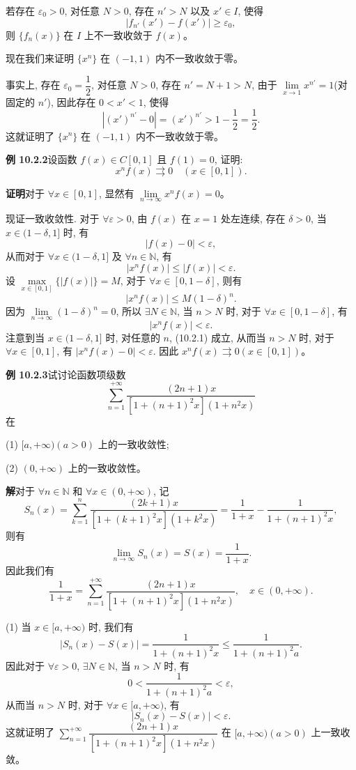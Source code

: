 \documentclass[UTF8, 12pt, fontset=fandol, oneside]{ctexart}
\begin{document}
若存在 $\varepsilon_0>0$, 对任意 $N>0$, 存在 $n'>N$ 以及 $x'\in I$, 使得
\[
  |f_{n'}(x')-f(x')|\geq\varepsilon_0,
\]
则 $\{f_n(x)\}$ 在 $I$ 上不一致收敛于 $f(x)$。

现在我们来证明 $\{x^n\}$ 在 $(-1,1)$ 内不一致收敛于零。

事实上, 存在 $\varepsilon_0=\dfrac12$, 对任意 $N>0$, 存在 $n'=N+1>N$, 由于 $\lim\limits_{x\to1}x^{n'}=1$(对固定的 $n'$), 因此存在 $0<x'<1$, 使得
\[
  |(x')^{n'}-0|=(x')^{n'}>1-\frac12=\frac12.
\]
这就证明了 $\{x^n\}$ 在 $(-1,1)$ 内不一致收敛于零。

\noindent\textbf{例 10.2.2}\quad 设函数 $f(x)\in C[0,1]$ 且 $f(1)=0$, 证明:
\[
  x^nf(x)\rightrightarrows0\quad(x\in[0,1]).
\]

\noindent\textbf{证明}\quad 对于 $\forall x\in[0,1]$, 显然有 $\lim\limits_{n\to\infty}x^nf(x)=0$。

现证一致收敛性. 对于 $\forall\varepsilon>0$, 由 $f(x)$ 在 $x=1$ 处左连续, 存在 $\delta>0$, 当 $x\in(1-\delta,1]$ 时, 有
\[
  |f(x)-0|<\varepsilon,
\]
从而对于 $\forall x\in(1-\delta,1]$ 及 $\forall n\in\mathbb N$, 有
\begin{equation}
  |x^nf(x)|\leq |f(x)|<\varepsilon.
  \tag{10.2.1}
\end{equation}
设 $\max\limits_{x\in[0,1]}\{|f(x)|\}=M$, 对于 $\forall x\in[0,1-\delta]$, 则有
\[
  |x^nf(x)|\leq M(1-\delta)^n.
\]
因为 $\lim\limits_{n\to\infty}(1-\delta)^n=0$, 所以 $\exists N\in\mathbb N$, 当 $n>N$ 时, 对于 $\forall x\in[0,1-\delta]$, 有
\[
  |x^nf(x)|<\varepsilon.
\]
注意到当 $x\in(1-\delta,1]$ 时, 对任意的 $n$, (10.2.1) 成立, 从而当 $n>N$ 时, 对于 $\forall x\in[0,1]$, 有 $|x^nf(x)-0|<\varepsilon$. 因此 $x^nf(x)\rightrightarrows0(x\in[0,1])$。

\noindent\textbf{例 10.2.3}\quad 试讨论函数项级数
\[
  \sum_{n=1}^{+\infty}\frac{(2n+1)x}{[1+(n+1)^2x](1+n^2x)}
\]
在

(1) $[a,+\infty)(a>0)$ 上的一致收敛性;

(2) $(0,+\infty)$ 上的一致收敛性。

\noindent\textbf{解}\quad 对于 $\forall n\in\mathbb N$ 和 $\forall x\in(0,+\infty)$, 记
\[
  S_n(x)=\sum_{k=1}^n\frac{(2k+1)x}{[1+(k+1)^2x](1+k^2x)}
  =\frac1{1+x}-\frac1{1+(n+1)^2x},
\]
则有
\[
  \lim_{n\to\infty}S_n(x)=S(x)=\frac1{1+x}.
\]
因此我们有
\[
  \frac1{1+x}=\sum_{n=1}^{+\infty}\frac{(2n+1)x}{[1+(n+1)^2x](1+n^2x)},\quad x\in(0,+\infty).
\]

(1) 当 $x\in[a,+\infty)$ 时, 我们有
\[
  |S_n(x)-S(x)|=\frac1{1+(n+1)^2x}\leq\frac1{1+(n+1)^2a}.
\]
因此对于 $\forall\varepsilon>0$, $\exists N\in\mathbb N$, 当 $n>N$ 时, 有
\[
  0<\frac1{1+(n+1)^2a}<\varepsilon,
\]
从而当 $n>N$ 时, 对于 $\forall x\in[a,+\infty)$, 有
\[
  |S_n(x)-S(x)|<\varepsilon.
\]
这就证明了 $\sum\limits_{n=1}^{+\infty}\dfrac{(2n+1)x}{[1+(n+1)^2x](1+n^2x)}$ 在 $[a,+\infty)(a>0)$ 上一致收敛。
\end{document}
